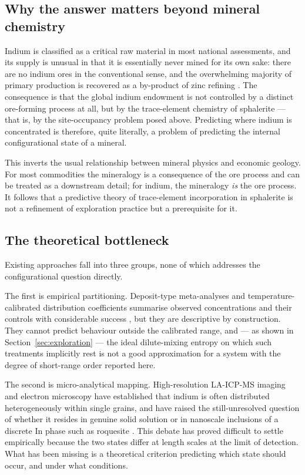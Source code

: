 \documentclass[11pt,a4paper]{article}
\begin{document}
\subsection{Why the answer matters beyond mineral chemistry}

Indium is classified as a critical raw material in most national assessments,
and its supply is unusual in that it is essentially never mined for its own
sake: there are no indium ores in the conventional sense, and the overwhelming
majority of primary production is recovered as a by-product of zinc refining
\citep{werner2015,usgs2024}. The consequence is
that the global indium endowment is not controlled by a distinct ore-forming
process at all, but by the trace-element chemistry of sphalerite --- that is, by
the site-occupancy problem posed above. Predicting where indium is concentrated
is therefore, quite literally, a problem of predicting the internal
configurational state of a mineral.

This inverts the usual relationship between mineral physics and economic
geology. For most commodities the mineralogy is a consequence of the ore process
and can be treated as a downstream detail; for indium, the mineralogy \emph{is}
the ore process. It follows that a predictive theory of trace-element
incorporation in sphalerite is not a refinement of exploration practice but a
prerequisite for it.

\subsection{The theoretical bottleneck}

Existing approaches fall into three groups, none of which addresses the
configurational question directly.

The first is empirical partitioning. Deposit-type meta-analyses and
temperature-calibrated distribution coefficients summarise observed
concentrations and their controls with considerable success
\citep{frenzel2016}, but they are
descriptive by construction. They cannot predict behaviour outside the
calibrated range, and --- as shown in Section~\ref{sec:exploration} --- the
ideal dilute-mixing entropy on which such treatments implicitly rest is not a
good approximation for a system with the degree of short-range order reported
here.

The second is micro-analytical mapping. High-resolution LA-ICP-MS imaging and
electron microscopy have established that indium is often distributed
heterogeneously within single grains, and have raised the still-unresolved
question of whether it resides in genuine solid solution or in nanoscale
inclusions of a discrete In phase such as roquesite \citep{moura2007}.
This debate has proved difficult to settle empirically because the two states
differ at length scales at the limit of detection. What has been missing is a
theoretical criterion predicting which state should occur, and under what
conditions.
\end{document}
